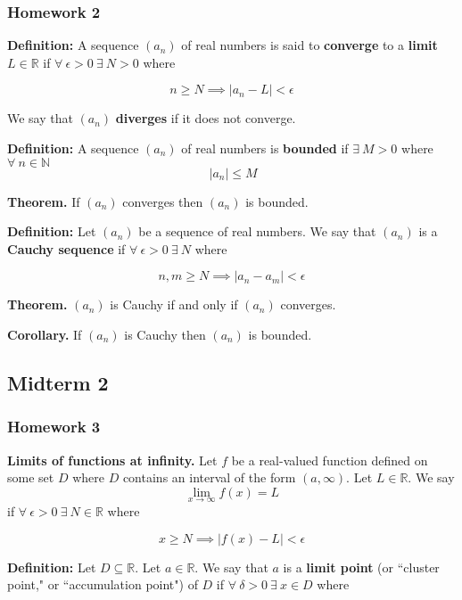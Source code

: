 \subsubsection{Homework 2}

\textbf{Definition:} A sequence \((a_n)\) of real numbers is said to \textbf{converge} to a \textbf{limit} \(L \in \mathbb{R}\) if \(\forall \ \epsilon > 0 \ \exists \ N > 0 \) where

\[
n \geq N \implies |a_n - L| < \epsilon
\]

We say that \((a_n)\) \textbf{diverges} if it does not converge.

\textbf{Definition:} A sequence \((a_n)\) of real numbers is \textbf{bounded} if \(\exists \ M > 0\) where \(\forall \ n \in \mathbb{N}\) \[\ |a_n| \leq M \]

\textbf{Theorem.} If \((a_n)\) converges then \((a_n)\) is bounded.

\textbf{Definition:} Let \((a_n)\) be a sequence of real numbers. We say that \((a_n)\) is a \textbf{Cauchy sequence} if \(\forall \ \epsilon > 0 \ \exists \ N\) where

\[
n, m \geq N \implies |a_n - a_m| < \epsilon
\]

\textbf{Theorem.} \((a_n)\) is Cauchy if and only if \((a_n)\) converges.

\textbf{Corollary.} If \((a_n)\) is Cauchy then \((a_n)\) is bounded.

\pagebreak

\subsection{Midterm 2}

\subsubsection{Homework 3}

\textbf{Limits of functions at infinity.} Let \(f\) be a real-valued function defined on some set \(D\) where \(D\) contains an interval of the form \((a, \infty)\). Let \(L \in \mathbb{R}\). We say \[\lim_{x \to \infty} f(x) = L\]if \(\forall \ \epsilon >0 \ \exists \ N \in \mathbb{R}\) where

\[
x \geq N \implies |f(x) - L| < \epsilon
\]

\textbf{Definition:} Let \(D \subseteq \mathbb{R}\). Let \(a \in \mathbb{R}\). We say that \(a\) is a \textbf{limit point} (or ``cluster point," or ``accumulation point") of \(D\) if \(\forall \ \delta > 0 \ \exists \ x \in D\) where

